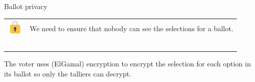 \documentclass[aspectratio=169]{beamer}
\begin{document}
\begin{frame}{Ballot privacy}
    \begin{tabular}{>{\arraybackslash}m{40px} >{\arraybackslash}m{320px}}
        \includegraphics[width=30px]{images/lock.png} & We need to ensure that nobody can see the selections for a ballot. \\~\\
    \end{tabular}

    The voter uses (ElGamal) encryption to encrypt the selection for each option in its ballot so only the talliers can decrypt. \\~\\


\end{frame}
\end{document}
